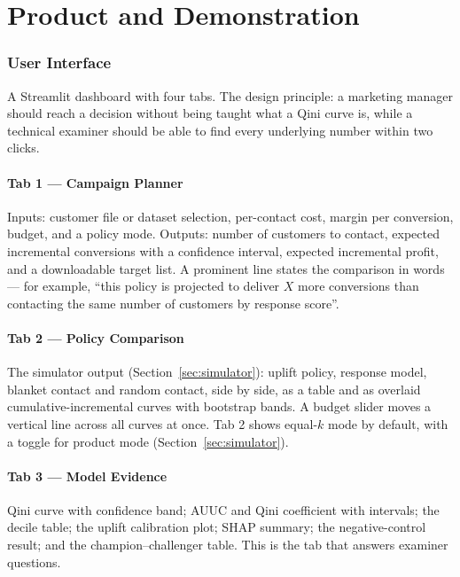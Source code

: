 \documentclass[11pt,a4paper]{article}
\begin{document}
\part{Product and Demonstration}

\section{User Interface}

A Streamlit dashboard with four tabs. The design principle: a marketing manager should reach a
decision without being taught what a Qini curve is, while a technical examiner should be able to
find every underlying number within two clicks.

\subsection{Tab 1 --- Campaign Planner}

Inputs: customer file or dataset selection, per-contact cost, margin per conversion, budget, and a
policy mode. Outputs: number of customers to contact, expected incremental conversions with a
confidence interval, expected incremental profit, and a downloadable target list. A prominent line
states the comparison in words --- for example, ``this policy is projected to deliver $X$ more
conversions than contacting the same number of customers by response score''.

\subsection{Tab 2 --- Policy Comparison}

The simulator output (Section~\ref{sec:simulator}): uplift policy, response model, blanket contact
and random contact, side by side, as a table and as overlaid cumulative-incremental curves with
bootstrap bands. A budget slider moves a vertical line across all curves at once. Tab 2 shows
equal-$k$ mode by default, with a toggle for product mode (Section~\ref{sec:simulator}).

\subsection{Tab 3 --- Model Evidence}

Qini curve with confidence band; AUUC and Qini coefficient with intervals; the decile table; the
uplift calibration plot; SHAP summary; the negative-control result; and the champion--challenger
table. This is the tab that answers examiner questions.
\end{document}
